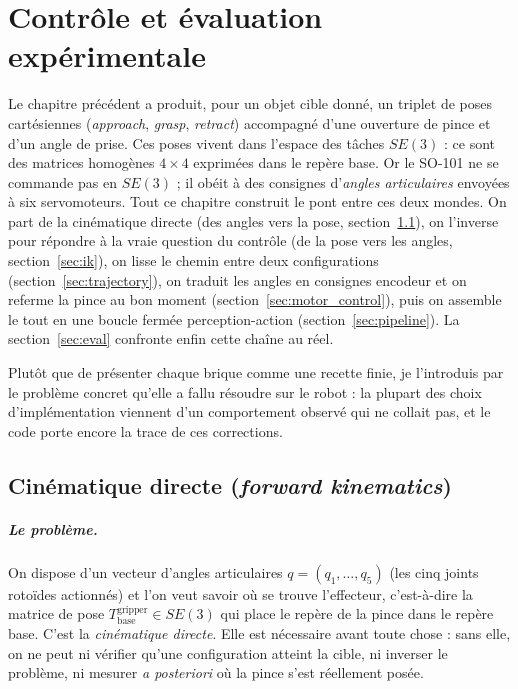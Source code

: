 \chapter{Contrôle et évaluation expérimentale}
\label{ch:control_eval}

Le chapitre précédent a produit, pour un objet cible donné, un triplet de poses
cartésiennes (\textit{approach}, \textit{grasp}, \textit{retract}) accompagné
d'une ouverture de pince et d'un angle de prise. Ces poses vivent dans l'espace
des tâches $SE(3)$ : ce sont des matrices homogènes $4\times4$ exprimées dans le
repère base. Or le SO-101 ne se commande pas en $SE(3)$ ; il obéit à des
consignes d'\emph{angles articulaires} envoyées à six servomoteurs. Tout ce
chapitre construit le pont entre ces deux mondes. On part de la cinématique
directe (des angles vers la pose, section~\ref{sec:fk}), on l'inverse pour
répondre à la vraie question du contrôle (de la pose vers les angles,
section~\ref{sec:ik}), on lisse le chemin entre deux configurations
(section~\ref{sec:trajectory}), on traduit les angles en consignes encodeur et
on referme la pince au bon moment (section~\ref{sec:motor_control}), puis on
assemble le tout en une boucle fermée perception-action
(section~\ref{sec:pipeline}). La section~\ref{sec:eval} confronte enfin cette
chaîne au réel.

Plutôt que de présenter chaque brique comme une recette finie, je l'introduis
par le problème concret qu'elle a fallu résoudre sur le robot : la plupart des
choix d'implémentation viennent d'un comportement observé qui ne collait pas, et
le code porte encore la trace de ces corrections.

\section{Cinématique directe (\textit{forward kinematics})}
\label{sec:fk}

\paragraph{Le problème.} On dispose d'un vecteur d'angles articulaires
$q = (q_1, \dots, q_5)$ (les cinq joints rotoïdes actionnés) et l'on veut savoir
où se trouve l'effecteur, c'est-à-dire la matrice de pose
$T_{\text{base}}^{\text{gripper}} \in SE(3)$ qui place le repère de la pince dans
le repère base. C'est la \emph{cinématique directe}. Elle est nécessaire avant
toute chose : sans elle, on ne peut ni vérifier qu'une configuration atteint la
cible, ni inverser le problème, ni mesurer \textit{a posteriori} où la pince
s'est réellement posée.

